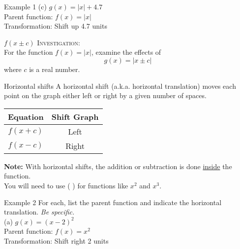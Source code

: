 \documentclass[t]{beamer}
\begin{document}
\begin{frame}{Example 1}
(c) \quad $g(x) = |x| + 4.7$	\newline\\	\pause
Parent function: $f(x) = |x|$	\newline\\	\pause
Transformation: Shift up 4.7 units
\end{frame}

\begin{frame}{$f(x \pm c)$}
\textsc{Investigation:}	\newline\\

For the function $f(x) = |x|$, examine the effects of
\[g(x) = |x \pm c| \]
where $c$ is a real number.
\end{frame}

\begin{frame}{Horizontal shifts}
A \alert{horizontal shift} (a.k.a. \alert{horizontal translation}) moves each point on the graph either left or right by a given number of spaces.	\newline\\	\pause
\begin{center}
\setlength{\extrarowheight}{6pt}
\begin{tabular}{c|c}
\textbf{Equation}	&	\textbf{Shift Graph} \\ \hline
$f(x+c)$	& Left	\\[6pt]	\hline
$f(x-c)$ & Right \\
\end{tabular}
\end{center}
\vspace{8pt} \pause
{\color{blue}\textbf{Note:}} With horizontal shifts, the addition or subtraction is done \underline{inside} the function. \pause \newline\\

You will need to use ( ) for functions like $x^2$ and $x^3$.
\end{frame}

\begin{frame}{Example 2}
For each, list the parent function and indicate the horizontal translation. \emph{Be specific.}	\newline\\
(a) \quad $g(x) = (x-2)^2$	\newline\\	\pause
Parent function: $f(x) = x^2$ \newline\\	\pause
Transformation: Shift right 2 units
\end{frame}
\end{document}
